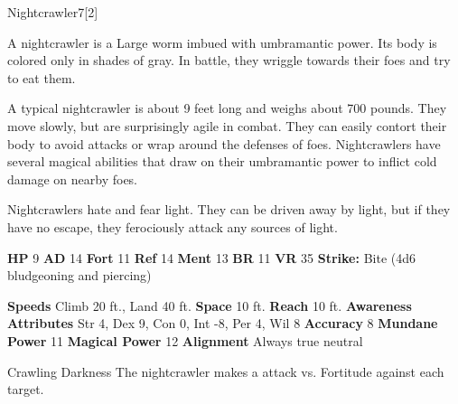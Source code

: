   \begin{monsection}{Nightcrawler}{7}[2]
    \vspace{-1em}\vspace{-1em}
    \vspace{0em}

    
        A nightcrawler is a Large worm imbued with umbramantic power.
        Its body is colored only in shades of gray.
        In battle, they wriggle towards their foes and try to eat them.
      
        A typical nightcrawler is about 9 feet long and weighs about 700 pounds.
        They move slowly, but are surprisingly agile in combat.
        They can easily contort their body to avoid attacks or wrap around the defenses of foes.
        Nightcrawlers have several magical abilities that draw on their umbramantic power to inflict cold damage on nearby foes.
      
        Nightcrawlers hate and fear light.
        They can be driven away by light, but if they have no escape, they ferociously attack any sources of light.
      

    \begin{spellcontent}
      \begin{spelltargetinginfo}
        \pari \textbf{HP} 9 \monsep
          \textbf{AD} 14 \monsep
          \textbf{Fort} 11 \monsep
          \textbf{Ref} 14 \monsep
          \textbf{Ment} 13
        \pari \textbf{BR} 11 \monsep
        \textbf{VR} 35
        \pari \textbf{Strike:}
            Bite  (4d6 bludgeoning and piercing)
      \end{spelltargetinginfo}
    \end{spellcontent}
    \begin{monsterfooter}
      \pari \textbf{Speeds} Climb 20 ft., Land 40 ft. \monsep
        \textbf{Space} 10 ft. \monsep
        \textbf{Reach} 10 ft.
      \pari \textbf{Awareness} 
      \pari \textbf{Attributes}
        Str 4, Dex 9,
        Con 0, Int -8,
        Per 4, Wil 8
      \pari \textbf{Accuracy} 8 \monsep
        \textbf{Mundane Power} 11 \monsep
      \textbf{Magical Power} 12
      \pari \textbf{Alignment} Always true neutral
    \end{monsterfooter}
  \end{monsection}
  \begin{freeability}{Crawling Darkness}
       The nightcrawler makes a  attack
        vs. Fortitude against each target.
    \end{freeability}
  

